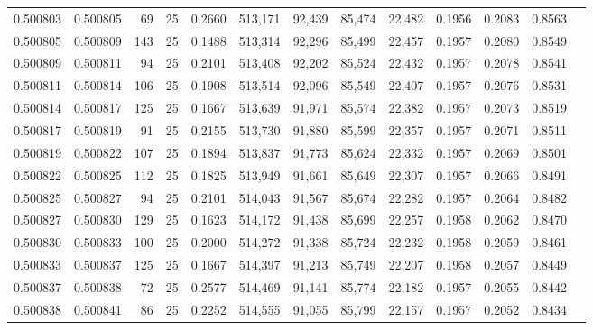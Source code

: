 \begin{tabular}{rrrrrrrrrrrrr}
0.500803 & 0.500805 &  69 &  25 &                                     0.2660 & 513,171 &  92,439 &  85,474 &  22,482 & 0.1956 & 0.2083 & 0.8563 \\
0.500805 & 0.500809 & 143 &  25 &                                     0.1488 & 513,314 &  92,296 &  85,499 &  22,457 & 0.1957 & 0.2080 & 0.8549 \\
0.500809 & 0.500811 &  94 &  25 &                                     0.2101 & 513,408 &  92,202 &  85,524 &  22,432 & 0.1957 & 0.2078 & 0.8541 \\
0.500811 & 0.500814 & 106 &  25 &                                     0.1908 & 513,514 &  92,096 &  85,549 &  22,407 & 0.1957 & 0.2076 & 0.8531 \\
0.500814 & 0.500817 & 125 &  25 &                                     0.1667 & 513,639 &  91,971 &  85,574 &  22,382 & 0.1957 & 0.2073 & 0.8519 \\
0.500817 & 0.500819 &  91 &  25 &                                     0.2155 & 513,730 &  91,880 &  85,599 &  22,357 & 0.1957 & 0.2071 & 0.8511 \\
0.500819 & 0.500822 & 107 &  25 &                                     0.1894 & 513,837 &  91,773 &  85,624 &  22,332 & 0.1957 & 0.2069 & 0.8501 \\
0.500822 & 0.500825 & 112 &  25 &                                     0.1825 & 513,949 &  91,661 &  85,649 &  22,307 & 0.1957 & 0.2066 & 0.8491 \\
0.500825 & 0.500827 &  94 &  25 &                                     0.2101 & 514,043 &  91,567 &  85,674 &  22,282 & 0.1957 & 0.2064 & 0.8482 \\
0.500827 & 0.500830 & 129 &  25 &                                     0.1623 & 514,172 &  91,438 &  85,699 &  22,257 & 0.1958 & 0.2062 & 0.8470 \\
0.500830 & 0.500833 & 100 &  25 &                                     0.2000 & 514,272 &  91,338 &  85,724 &  22,232 & 0.1958 & 0.2059 & 0.8461 \\
0.500833 & 0.500837 & 125 &  25 &                                     0.1667 & 514,397 &  91,213 &  85,749 &  22,207 & 0.1958 & 0.2057 & 0.8449 \\
0.500837 & 0.500838 &  72 &  25 &                                     0.2577 & 514,469 &  91,141 &  85,774 &  22,182 & 0.1957 & 0.2055 & 0.8442 \\
0.500838 & 0.500841 &  86 &  25 &                                     0.2252 & 514,555 &  91,055 &  85,799 &  22,157 & 0.1957 & 0.2052 & 0.8434 \\

\end{tabular}
